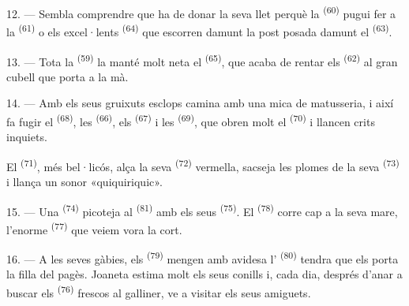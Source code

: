 12. --- Sembla comprendre que ha de donar la seva llet perquè la 
\textsuperscript{(60)} pugui fer  a la 
\textsuperscript{(61)} o els excel·lents  \textsuperscript{(64)} que
escorren damunt la post posada damunt el
 \textsuperscript{(63)}.

13. --- Tota la  \textsuperscript{(59)} la manté molt neta el
 \textsuperscript{(65)}, que acaba de rentar els
 \textsuperscript{(62)} al gran cubell que porta a la
mà.

\VUsaut{3.0mm}
\VUsaut{3.0mm}

14. --- Amb els seus gruixuts esclops camina amb una mica de matusseria, i així fa fugir el
 \textsuperscript{(68)}, les  \textsuperscript{(66)}, els
 \textsuperscript{(67)} i les
 \textsuperscript{(69)}, que obren molt el 
\textsuperscript{(70)} i llancen crits inquiets.

El  \textsuperscript{(71)}, més bel·licós, alça la seva
 \textsuperscript{(72)} vermella, sacseja les plomes de la seva
 \textsuperscript{(73)} i llança un sonor «quiquiriquic».

15. --- Una  \textsuperscript{(74)} picoteja al 
\textsuperscript{(81)} amb els seus  \textsuperscript{(75)}. El
 \textsuperscript{(78)} corre cap a la seva mare, l'enorme
 \textsuperscript{(77)} que veiem vora la cort.

16. --- A les seves gàbies, els  \textsuperscript{(79)} mengen amb avidesa
l' \textsuperscript{(80)} tendra que els porta la filla del pagès. Joaneta
estima molt els seus conills i, cada dia, després d'anar a buscar els 
\textsuperscript{(76)} frescos al galliner, ve a visitar els seus amiguets.
\VUsaut{6.0mm}
\VUfilet{22mm}

